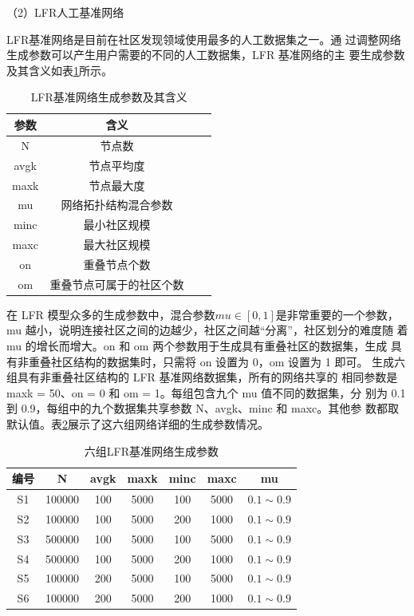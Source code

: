 （2）LFR人工基准网络

LFR基准网络是目前在社区发现领域使用最多的人工数据集之一。通
过调整网络生成参数可以产生用户需要的不同的人工数据集，LFR 基准网络的主
要生成参数及其含义如表\ref{tab:tab3-4}所示。

\begin{table}
  \centering
  \caption{LFR基准网络生成参数及其含义} \label{tab:tab3-4}
  \begin{tabular*}{0.9\textwidth}{@{\extracolsep{\fill}}cccc}
  \toprule
    参数		&含义\\
  \midrule
    N  &节点数\\
    avgk	&节点平均度\\ 
    maxk  &节点最大度\\
    mu  &网络拓扑结构混合参数\\
    minc  &最小社区规模\\
    maxc  &最大社区规模 \\
    on    &重叠节点个数\\
    om    &重叠节点可属于的社区个数\\
  \bottomrule
  \end{tabular*}
\end{table}

在 LFR 模型众多的生成参数中，混合参数$ mu \in [0,1]$是非常重要的一个参数，
mu 越小，说明连接社区之间的边越少，社区之间越“分离”，社区划分的难度随
着 mu 的增长而增大。on 和 om 两个参数用于生成具有重叠社区的数据集，生成
具有非重叠社区结构的数据集时，只需将 on 设置为 0，om 设置为 1 即可。 
生成六组具有非重叠社区结构的 LFR 基准网络数据集，所有的网络共享的
相同参数是 maxk = 50、on = 0 和 om = 1。每组包含九个 mu 值不同的数据集，分
别为 0.1 到 0.9，每组中的九个数据集共享参数 N、avgk、minc 和 maxc。其他参
数都取默认值。表\ref{tab:tab3-5}展示了这六组网络详细的生成参数情况。 

\begin{table}
  \centering
  \caption{六组LFR基准网络生成参数} \label{tab:tab3-5}
  \begin{tabular*}{0.9\textwidth}{@{\extracolsep{\fill}}ccccccc}
  \toprule
    编号		&N  &avgk &maxk &minc &maxc &mu\\
  \midrule
    S1  &100000  &100 &5000 &100 &5000 &$0.1\sim 0.9$\\
    S2  &100000  &100 &5000 &200 &1000 &$0.1\sim 0.9$\\
    S3  &500000  &100 &5000 &100 &5000 &$0.1\sim 0.9$\\
    S4  &500000  &100 &5000 &200 &1000 &$0.1\sim 0.9$\\
    S5  &100000  &200 &5000 &100 &5000 &$0.1\sim 0.9$\\
    S6  &100000  &200 &5000 &200 &1000 &$0.1\sim 0.9$\\
  \bottomrule
  \end{tabular*}
\end{table}

